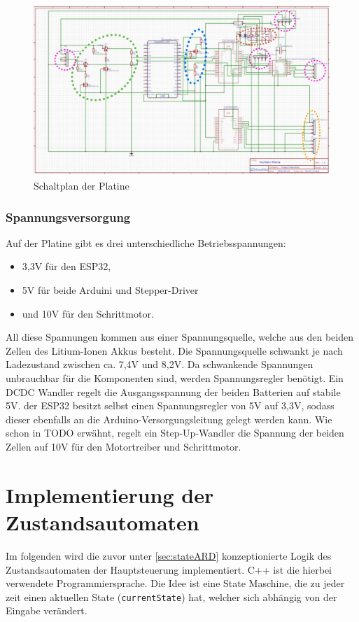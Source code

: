 \begin{figure}[h]
	\begin{center}
		\includegraphics[width=13.3cm]{schaltplan.jpg}
		\caption{\label{pic:schaltplan} Schaltplan der Platine}
	\end{center}
\end{figure}

\subsection{Spannungsversorgung}
Auf der Platine gibt es drei unterschiedliche Betriebsspannungen: 
\begin{center}
	\begin{itemize}
		\item 3,3V für den ESP32,
		\item 5V für beide Arduini und Stepper-Driver
		\item und 10V für den Schrittmotor.
	\end{itemize}
\end{center}
All diese Spannungen kommen aus einer Spannungsquelle, welche aus den beiden Zellen des Litium-Ionen Akkus besteht. Die Spannungsquelle schwankt je nach Ladezustand zwischen ca. 7,4V und 8,2V. Da schwankende Spannungen unbrauchbar für die Komponenten sind, werden Spannungsregler benötigt. 
Ein DCDC Wandler regelt die Ausgangsspannung der beiden Batterien auf stabile 5V. der ESP32 besitzt selbst einen Spannungsregler von 5V auf 3,3V, sodass dieser ebenfalls an die Arduino-Versorgungsleitung gelegt werden kann. Wie schon in TODO erwähnt, regelt ein Step-Up-Wandler die Spannung der beiden Zellen auf 10V für den Motortreiber und Schrittmotor. 

\chapter{Implementierung der Zustandsautomaten}
Im folgenden wird die zuvor unter \autoref{sec:stateARD} konzeptionierte Logik des Zustandsautomaten der Hauptsteuerung implementiert.
C++ ist die hierbei verwendete Programmiersprache. Die Idee ist eine State Maschine, die zu jeder zeit einen aktuellen State (\texttt{currentState}) hat, welcher sich abhängig von der Eingabe verändert.

